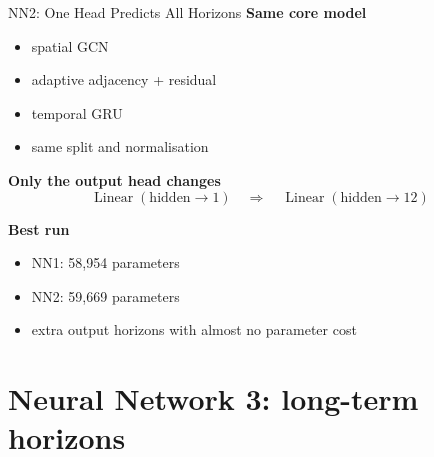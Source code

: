 \documentclass[aspectratio=169]{beamer}
\begin{document}
\begin{frame}{NN2: One Head Predicts All Horizons}
\small
\textbf{Same core model}
\begin{itemize}
  \item spatial GCN
  \item adaptive adjacency + residual
  \item temporal GRU
  \item same split and normalisation
\end{itemize}

\vspace{0.8em}
\textbf{Only the output head changes}
\[
\operatorname{Linear}(\mathrm{hidden} \to 1)
\quad \Longrightarrow \quad
\operatorname{Linear}(\mathrm{hidden} \to 12)
\]

\vspace{0.7em}
\textbf{Best run}
\begin{itemize}
  \item NN1: 58,954 parameters
  \item NN2: 59,669 parameters
  \item extra output horizons with almost no parameter cost
\end{itemize}
\end{frame}

\section[NN3]{Neural Network 3: long-term horizons}
\end{document}
